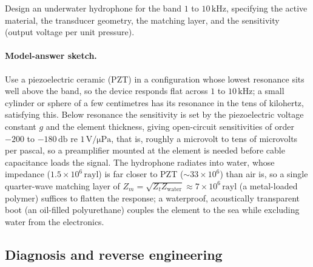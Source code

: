 \begin{exercise}
Design an underwater hydrophone for the band $1$ to $10\,\si{\kilo
\hertz}$, specifying the active material, the transducer geometry,
the matching layer, and the sensitivity (output voltage per unit
pressure).
\paragraph{Model-answer sketch.} Use a piezoelectric ceramic (PZT) in
a configuration whose lowest resonance sits well above the band, so the
device responds flat across $1$ to $10\,\si{\kilo\hertz}$; a small
cylinder or sphere of a few centimetres has its resonance in the tens
of kilohertz, satisfying this. Below resonance the sensitivity is set
by the piezoelectric voltage constant $g$ and the element thickness,
giving open-circuit sensitivities of order $-200$ to $-180\,\si{
\decibel}$ re $1\,\si{\volt}/\si{\micro\pascal}$, that is, roughly a
microvolt to tens of microvolts per pascal, so a preamplifier mounted
at the element is needed before cable capacitance loads the signal.
The hydrophone radiates into water, whose impedance ($1.5\times
10^{6}\,\text{rayl}$) is far closer to PZT ($\sim 33\times 10^{6}$)
than air is, so a single quarter-wave matching layer of $Z_m =
\sqrt{Z_t Z_{\text{water}}} \approx 7\times 10^{6}\,\text{rayl}$ (a
metal-loaded polymer) suffices to flatten the response; a waterproof,
acoustically transparent boot (an oil-filled polyurethane) couples the
element to the sea while excluding water from the electronics.
\end{exercise}

\subsection*{Diagnosis and reverse engineering}

